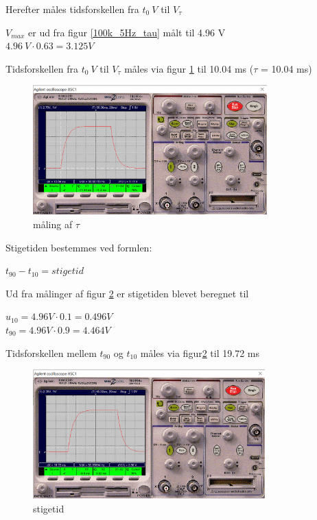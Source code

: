 Herefter måles tidsforskellen fra $t_0 \ V$ til $V_{\tau}$

$V_{max}$ er ud fra figur \ref{100k_5Hz_tau} målt til 4.96 V
\\
$4.96 \ V \cdot 0.63 = 3.125 V$

Tidsforskellen fra $t_0 \ V$ til $V_{\tau}$ måles via figur \ref{100k.5Hz.tau} til 10.04 ms ($\tau$ = 10.04 ms)

\begin{figure}[h]
 \begin{center}
  \includegraphics[height=5cm]{P_Fig/figur6_100k_5Hz_tau.png}
  \caption{måling af $\tau$}
  \label{100k.5Hz.tau}
 \end{center}
\end{figure}

\newpage

Stigetiden bestemmes ved formlen:
\begin{center}
$t_{90} - t_{10} = stigetid$
\end{center}

Ud fra målinger af figur \ref{100k.5Hz.stigetid}
er stigetiden blevet beregnet til

\begin{center}
$u_{10} = 4.96 V \cdot 0.1 = 0.496 V$
\\
$t_{90} = 4.96 V \cdot 0.9 = 4.464 V$
\end{center}

Tidsforskellen mellem $t_{90}$ og $t_{10}$ måles via figur\ref{100k.5Hz.stigetid} til 19.72 ms

\begin{figure}[h]
 \begin{center}
  \includegraphics[height=5cm]{P_Fig/figur7_100k_5Hz_stigetid.png}
  \caption{stigetid}
  \label{100k.5Hz.stigetid}
 \end{center}
\end{figure}

